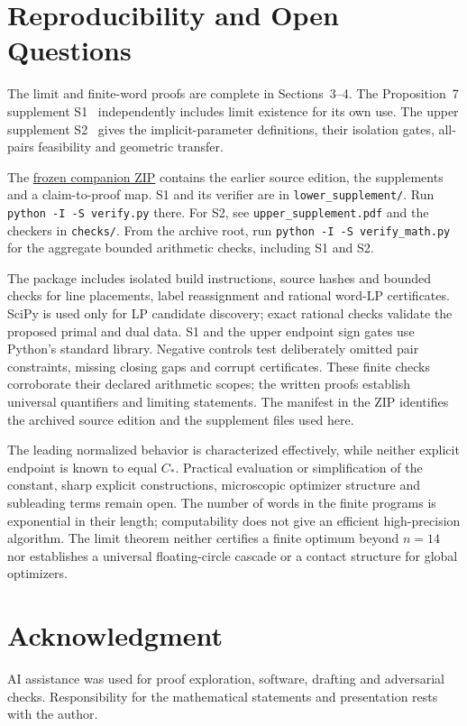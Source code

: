 \documentclass[11pt,letterpaper]{article}
\theoremstyle{definition}\newtheorem{definition}[theorem]{Definition}
\theoremstyle{remark}\newtheorem{remark}[theorem]{Remark}
\newcommand{\CC}{C_\ast}
\begin{document}
\section{Reproducibility and Open Questions}

The limit and finite-word proofs are complete in Sections~3--4. The
Proposition~7 supplement S1~\cite{lower} independently includes
limit existence for its own use. The upper supplement S2~\cite{upper}
gives the implicit-parameter definitions, their isolation gates, all-pairs
feasibility and geometric transfer.

The \href{https://github.com/falker47/ringmin/raw/4b3721df8061f1992cfd242df69b1a0643216d8f/paper_assets/paper_ii_journal/source_bundle.zip}{frozen companion ZIP}
contains the earlier source edition, the supplements and a claim-to-proof map.
S1 and its verifier are in \texttt{lower\_supplement/}. Run
\mbox{\texttt{python -I -S verify.py}} there. For S2, see
\texttt{upper\_supplement.pdf} and the checkers in \texttt{checks/}.
From the archive root, run \mbox{\texttt{python -I -S verify\_math.py}}
for the aggregate bounded arithmetic checks, including S1 and S2.

The package includes isolated build instructions, source hashes and bounded
checks for line placements, label reassignment and rational word-LP
certificates. SciPy is used only for LP candidate discovery; exact rational
checks validate the proposed primal and dual data. S1 and the upper endpoint
sign gates use Python's standard library. Negative controls test deliberately
omitted pair constraints, missing closing gaps and corrupt certificates.
These finite checks corroborate their declared arithmetic scopes; the
written proofs establish universal quantifiers and limiting statements.
The manifest in the ZIP identifies the archived source edition and
the supplement files used here.

The leading normalized behavior is characterized effectively, while neither
explicit endpoint is known to equal $\CC$. Practical evaluation or
simplification of the constant, sharp explicit constructions, microscopic
optimizer structure and subleading terms remain open. The number of words
in the finite programs is exponential in their length; computability does
not give an efficient high-precision algorithm. The limit theorem neither
certifies a finite optimum beyond $n=14$ nor establishes a universal
floating-circle cascade or a contact structure for global optimizers.

\section*{Acknowledgment}
AI assistance was used for proof exploration, software, drafting and
adversarial checks. Responsibility for the mathematical statements and
presentation rests with the author.
\end{document}
